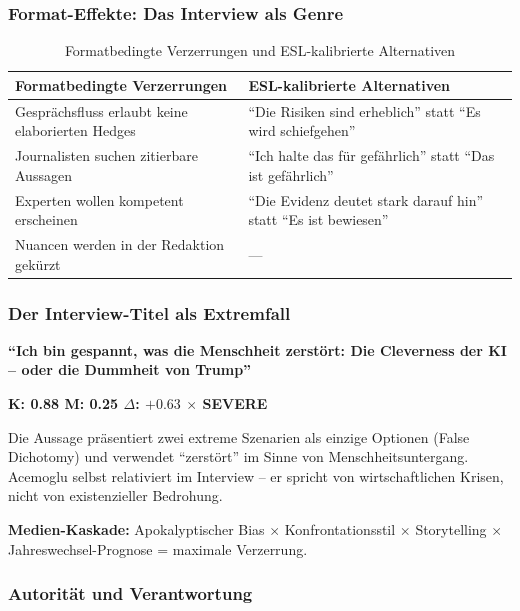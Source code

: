 \subsubsection{Format-Effekte: Das Interview als Genre}

\begin{table}[H]
\centering
\caption{Formatbedingte Verzerrungen und ESL-kalibrierte Alternativen}
\small
\begin{tabular}{p{6cm}|p{6cm}}
\toprule
\textbf{Formatbedingte Verzerrungen} & \textbf{ESL-kalibrierte Alternativen} \\
\midrule
Gespr\"achsfluss erlaubt keine elaborierten Hedges & ``Die Risiken sind erheblich'' statt ``Es wird schiefgehen'' \\
Journalisten suchen zitierbare Aussagen & ``Ich halte das f\"ur gef\"ahrlich'' statt ``Das ist gef\"ahrlich'' \\
Experten wollen kompetent erscheinen & ``Die Evidenz deutet stark darauf hin'' statt ``Es ist bewiesen'' \\
Nuancen werden in der Redaktion gek\"urzt & --- \\
\bottomrule
\end{tabular}
\end{table}


\subsubsection{Der Interview-Titel als Extremfall}

\begin{tcolorbox}[colback=red!5!white,colframe=red!50!black,title=Claim 22: Interview-Titel]
\textbf{``Ich bin gespannt, was die Menschheit zerst\"ort: Die Cleverness der KI -- oder die Dummheit von Trump''}

\textbf{K: 0.88 \quad M: 0.25 \quad $\Delta$: $+0.63$ \quad $\times$ SEVERE}

Die Aussage pr\"asentiert zwei extreme Szenarien als einzige Optionen (False Dichotomy) und verwendet ``zerst\"ort'' im Sinne von Menschheitsuntergang. Acemoglu selbst relativiert im Interview -- er spricht von wirtschaftlichen Krisen, nicht von existenzieller Bedrohung.

\textbf{Medien-Kaskade:} Apokalyptischer Bias $\times$ Konfrontationsstil $\times$ Storytelling $\times$ Jahreswechsel-Prognose = maximale Verzerrung.
\end{tcolorbox}


\subsubsection{Autorit\"at und Verantwortung}

